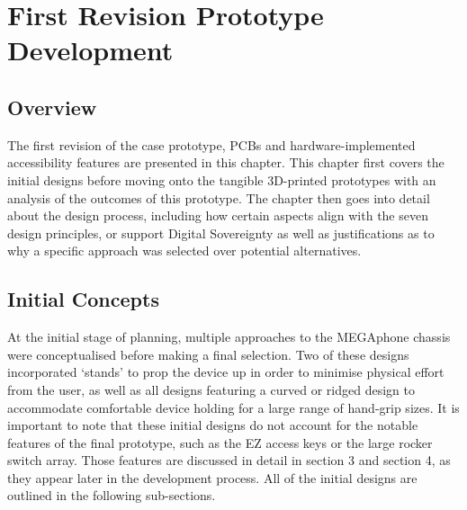 
\chapter{First Revision Prototype Development} %

\label{Chapter4} %

\section{Overview} %

The first revision of the case prototype, PCBs and hardware-implemented accessibility features are presented in this chapter.
This chapter first covers the initial designs before moving onto the tangible 3D-printed prototypes with an analysis of the outcomes of this prototype.
The chapter then goes into detail about the design process, including how certain aspects align with the seven design principles, or support Digital Sovereignty as well as justifications as to why a specific approach was selected over potential alternatives.

\section{Initial Concepts}

At the initial stage of planning, multiple approaches to the MEGAphone chassis were conceptualised before making a final selection.
Two of these designs incorporated ‘stands’ to prop the device up in order to minimise physical effort from the user, as well as all designs featuring a curved or ridged design to accommodate comfortable device holding for a large range of hand-grip sizes. 
It is important to note that these initial designs do not account for the notable features of the final prototype, such as the EZ access keys or the large rocker switch array.
Those features are discussed in detail in section 3 and section 4, as they appear later in the development process.
All of the initial designs are outlined in the following sub-sections.

